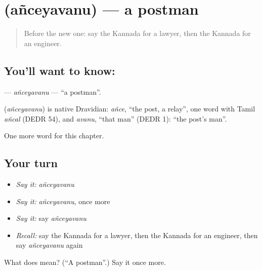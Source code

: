 \section[\texorpdfstring{\kn{ಅಂಚೆಯವನು} (añceyavanu)}{ಅಂಚೆಯವನು (añceyavanu)}]{ (añceyavanu) — a postman}

\label{lesson:KA-C268-anceyavanu}



\begin{quote}
Before the new one: say the Kannada for a lawyer, then the Kannada for an engineer.
\end{quote}

\subsection*{You'll want to know: }
\textbf{} — \emph{añceyavanu} — \textquotedblleft{}a postman\textquotedblright{}.

\begin{cousinweb}
\textbf{} (\emph{añceyavanu}) is native Dravidian: \emph{añce}, \textquotedblleft{}the post, a relay\textquotedblright{}, one word with Tamil \emph{añcal} (DEDR 54), and \emph{avanu}, \textquotedblleft{}that man\textquotedblright{} (DEDR 1): \textquotedblleft{}the post's man\textquotedblright{}.
\end{cousinweb}

\begin{grammarlens}[title={What you've built}]
One more word for this chapter.
\end{grammarlens}

\subsection*{Your turn}
\begin{itemize}
\raggedright
  \item \emph{Say it:} \emph{añceyavanu}
  \item \emph{Say it:} \emph{añceyavanu}, once more
  \item \emph{Say it:} say \emph{añceyavanu}
  \item \emph{Recall:} say the Kannada for a lawyer, then the Kannada for an engineer, then say \emph{añceyavanu} again
\end{itemize}

\begin{tcolorbox}[breakable,colback=teal!4,colframe=teal!35!black,title={Before you move on}]
What does  mean? (\textquotedblleft{}A postman\textquotedblright{}.) Say it once more.
\end{tcolorbox}
